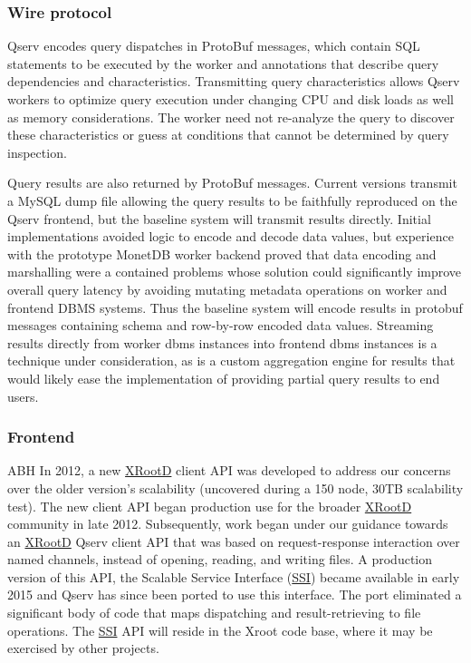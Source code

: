 \documentclass[DM,lsstdraft,toc]{lsstdoc}
\begin{document}
\subsubsection{Wire protocol}\label{wire-protocol}

Qserv encodes query dispatches in ProtoBuf messages, which contain SQL
statements to be executed by the worker and annotations that describe
query dependencies and characteristics. Transmitting query
characteristics allows Qserv workers to optimize query execution under
changing CPU and disk loads as well as memory considerations. The worker
need not re-analyze the query to discover these characteristics or guess
at conditions that cannot be determined by query inspection.

Query results are also returned by ProtoBuf messages. Current versions
transmit a MySQL dump file allowing the query results to be faithfully
reproduced on the Qserv frontend, but the baseline system will transmit
results directly. Initial implementations avoided logic to encode and
decode data values, but experience with the prototype MonetDB worker
backend proved that data encoding and marshalling were a contained
problems whose solution could significantly improve overall query
latency by avoiding mutating metadata operations on worker and frontend
DBMS systems. Thus the baseline system will encode results in protobuf
messages containing schema and row-by-row encoded data values. Streaming
results directly from worker dbms instances into frontend dbms instances
is a technique under consideration, as is a custom aggregation engine
for results that would likely ease the implementation of providing
partial query results to end users.

\subsubsection{Frontend}\label{frontend}

ABH In 2012, a new \href{http://xrootd.org}{XRootD} client API was
developed to address our concerns over the older version's scalability
(uncovered during a 150 node, 30TB scalability test). The new client API
began production use for the broader \href{http://xrootd.org}{XRootD}
community in late 2012. Subsequently, work began under our guidance
towards an \href{http://xrootd.org}{XRootD} Qserv client API that was
based on request-response interaction over named channels, instead of
opening, reading, and writing files. A production version of this API,
the Scalable Service Interface (\href{}{SSI}) became available in early
2015 and Qserv has since been ported to use this interface. The port
eliminated a significant body of code that maps dispatching and
result-retrieving to file operations. The \href{}{SSI} API will reside
in the Xroot code base, where it may be exercised by other projects.
\end{document}
